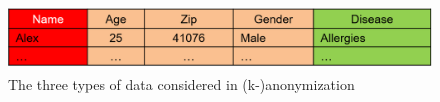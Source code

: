\documentclass{llncs}
\begin{document}

\begin{figure}[!t]
	\begin{center}
		\includegraphics[width=\textwidth]{figures/anonym/3typesofdata}
		\caption{The three types of data considered in (k-)anonymization}
		\label{fig:anon_categories}
	\end{center}
\end{figure}
\end{document}
